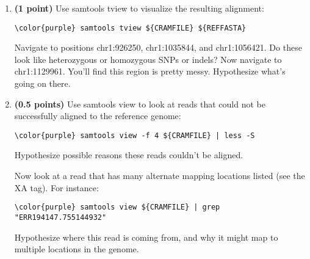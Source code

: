 \documentclass[12pt]{article}
\begin{document}
\begin{enumerate}
\begin{itemize}
	Hint: samtools mpileup command can be used to pull out the coverage for each base, e.g.:

\begin{Verbatim}[commandchars=\\\{\}]
\color{purple} samtools mpileup -r chr1 ${CRAMFILE} | cut -f 4 
\end{Verbatim}
	will give you the coverage at each base in chromosome 1 only. See the lecture 11 slides for helpful UNIX tips in dealing with this data. 

	\item Plot a histogram of template length for each mate pair mapped to chromosome 1. Explain what this number means. What is the average? Standard deviation? Do you notice any artifacts in your histogram? Hint: what's going on with pairs with a template length "0"? 

	Hint: the 9th column of the CRAM file gives the template length:
\begin{Verbatim}[commandchars=\\\{\}]
\color{purple} samtools view ${CRAMFILE} chr1 | cut -f 9
\end{Verbatim}

\end{itemize}

\item \textbf{(1 point)} Use samtools tview to visualize the resulting alignment:

\begin{Verbatim}[commandchars=\\\{\}]
\color{purple} samtools tview ${CRAMFILE} ${REFFASTA}
\end{Verbatim}

Navigate to positions chr1:926250, chr1:1035844, and chr1:1056421. Do these look like heterozygous or homozygous SNPs or indels? Now navigate to chr1:1129961. You'll find this region is pretty messy. Hypothesize what's going on there.

\item \textbf{(0.5 points)} Use samtools view to look at reads that could not be successfully aligned to the reference genome:

\begin{Verbatim}[commandchars=\\\{\}]
\color{purple} samtools view -f 4 ${CRAMFILE} | less -S
\end{Verbatim}
Hypothesize possible reasons these reads couldn't be aligned.

Now look at a read that has many alternate mapping locations listed (see the XA tag). For instance:
\begin{Verbatim}[commandchars=\\\{\}]
\color{purple} samtools view ${CRAMFILE} | grep "ERR194147.755144932"
\end{Verbatim}
Hypothesize where this read is coming from, and why it might map to multiple locations in the genome.

\end{enumerate}
\end{document}
